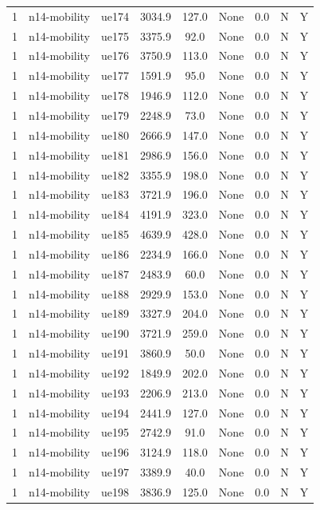 \begin{table}[ht]
\begin{tabular}{|c|c|c|c|c|c|c|c|c|}
1 & n14-mobility & ue174 & 3034.9 & 127.0 & None & 0.0 & N & Y \\
1 & n14-mobility & ue175 & 3375.9 & 92.0 & None & 0.0 & N & Y \\
1 & n14-mobility & ue176 & 3750.9 & 113.0 & None & 0.0 & N & Y \\
1 & n14-mobility & ue177 & 1591.9 & 95.0 & None & 0.0 & N & Y \\
1 & n14-mobility & ue178 & 1946.9 & 112.0 & None & 0.0 & N & Y \\
1 & n14-mobility & ue179 & 2248.9 & 73.0 & None & 0.0 & N & Y \\
1 & n14-mobility & ue180 & 2666.9 & 147.0 & None & 0.0 & N & Y \\
1 & n14-mobility & ue181 & 2986.9 & 156.0 & None & 0.0 & N & Y \\
1 & n14-mobility & ue182 & 3355.9 & 198.0 & None & 0.0 & N & Y \\
1 & n14-mobility & ue183 & 3721.9 & 196.0 & None & 0.0 & N & Y \\
1 & n14-mobility & ue184 & 4191.9 & 323.0 & None & 0.0 & N & Y \\
1 & n14-mobility & ue185 & 4639.9 & 428.0 & None & 0.0 & N & Y \\
1 & n14-mobility & ue186 & 2234.9 & 166.0 & None & 0.0 & N & Y \\
1 & n14-mobility & ue187 & 2483.9 & 60.0 & None & 0.0 & N & Y \\
1 & n14-mobility & ue188 & 2929.9 & 153.0 & None & 0.0 & N & Y \\
1 & n14-mobility & ue189 & 3327.9 & 204.0 & None & 0.0 & N & Y \\
1 & n14-mobility & ue190 & 3721.9 & 259.0 & None & 0.0 & N & Y \\
1 & n14-mobility & ue191 & 3860.9 & 50.0 & None & 0.0 & N & Y \\
1 & n14-mobility & ue192 & 1849.9 & 202.0 & None & 0.0 & N & Y \\
1 & n14-mobility & ue193 & 2206.9 & 213.0 & None & 0.0 & N & Y \\
1 & n14-mobility & ue194 & 2441.9 & 127.0 & None & 0.0 & N & Y \\
1 & n14-mobility & ue195 & 2742.9 & 91.0 & None & 0.0 & N & Y \\
1 & n14-mobility & ue196 & 3124.9 & 118.0 & None & 0.0 & N & Y \\
1 & n14-mobility & ue197 & 3389.9 & 40.0 & None & 0.0 & N & Y \\
1 & n14-mobility & ue198 & 3836.9 & 125.0 & None & 0.0 & N & Y \\

\end{tabular}
\end{table}
